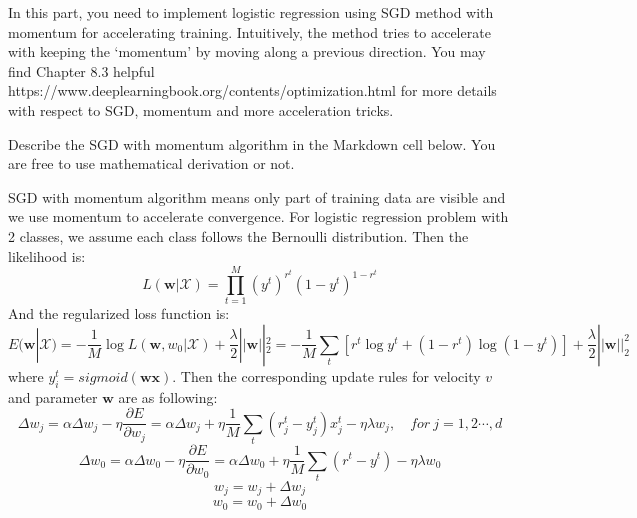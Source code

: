 \documentclass[11pt]{article}
\begin{document}
    In this part, you need to implement logistic regression using SGD method
with momentum for accelerating training. Intuitively, the method tries
to accelerate with keeping the `momentum' by moving along a previous
direction. You may find Chapter 8.3 helpful
https://www.deeplearningbook.org/contents/optimization.html for more
details with respect to SGD, momentum and more acceleration tricks.

    Describe the SGD with momentum algorithm in the Markdown cell below. You
are free to use mathematical derivation or not.

    SGD with momentum algorithm means only part of training data are visible
and we use momentum to accelerate convergence. For logistic regression
problem with 2 classes, we assume each class follows the Bernoulli
distribution. Then the likelihood is:
\[L(\mathbf{w}|\mathcal{X})=\prod_{t=1}^M(y^t)^{r^t}(1-y^t)^{1-r^t}\]
And the regularized loss function is:
\[E(\mathbf{w}|\mathcal{X})=-\frac{1}{M}\log{L(\mathbf{w},w_0|\mathcal{X})}+\frac{\lambda}{2}||\mathbf{w}||_2^2=-\frac{1}{M}\sum_t\left[r^t\log{y^t}+(1-r^t)\log{(1-y^t)}\right]+\frac{\lambda}{2}||\mathbf{w}||_2^2\]
where \(y_i^t = sigmoid(\mathbf{wx})\). Then the corresponding update
rules for velocity \(v\) and parameter \(\mathbf{w}\) are as following:
\[\Delta w_j=\alpha \Delta w_j-\eta\frac{\partial E}{\partial w_j}=\alpha \Delta w_j+\eta\frac{1}{M}\sum_t(r_j^t-y_j^t)x_j^t-\eta\lambda w_j,\quad for\ j=1,2\cdots,d\]
\[\Delta w_0=\alpha \Delta w_0-\eta\frac{\partial E}{\partial w_0}=\alpha \Delta w_0+\eta\frac{1}{M}\sum_t(r^t-y^t)-\eta\lambda w_0\]
\[w_j = w_j + \Delta w_j\] \[w_0 = w_0 + \Delta w_0\]
\end{document}
